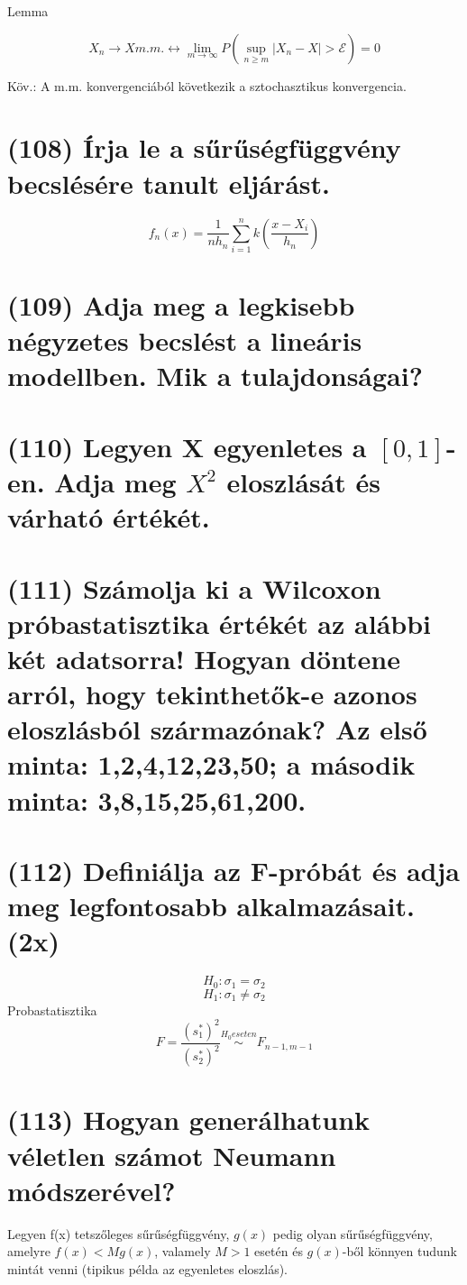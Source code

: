 \documentclass[12p]{article}
\begin{document}
Lemma

$$X_n \rightarrow X m.m. \leftrightarrow \lim_{m \rightarrow \infty} P(\sup_{n \geq m} |X_n - X| > \mathcal{E}) = 0$$

Köv.: A m.m. konvergenciából következik a
sztochasztikus konvergencia.


\section{(108) Írja le a sűrűségfüggvény becslésére tanult eljárást.}

$$f_n(x) = \frac{1}{nh_n}\sum^n_{i=1}k\left( \frac{x-X_i}{h_n} \right)$$

\section{(109) Adja meg a legkisebb négyzetes becslést a lineáris modellben. Mik a tulajdonságai?}

\section{(110) Legyen X egyenletes a $[0, 1]$-en. Adja meg $X^2$ eloszlását és várható értékét.}

\section{(111) Számolja ki a Wilcoxon próbastatisztika értékét az alábbi két adatsorra! Hogyan döntene arról, hogy tekinthetők-e azonos eloszlásból származónak? Az első minta: 1,2,4,12,23,50;
a második minta: 3,8,15,25,61,200.}

\section{(112) Definiálja az F-próbát és adja meg legfontosabb alkalmazásait. (2x)}

$$H_0: \sigma_1 = \sigma_2$$
$$H_1: \sigma_1 \neq \sigma_2$$
Probastatisztika
$$F= \frac{(s_1^{*})^2}{(s_2^{*})^2} \stackrel{H_0 eseten}{\sim} F_{n-1,m-1}$$

\section{(113)  Hogyan generálhatunk véletlen számot Neumann módszerével?}

Legyen f(x) tetszőleges sűrűségfüggvény, $g(x)$ pedig olyan sűrűségfüggvény, amelyre $f(x) < Mg(x)$, valamely $M>1$ esetén és $g(x)$-ből könnyen tudunk mintát venni (tipikus példa az egyenletes eloszlás).
\end{document}
